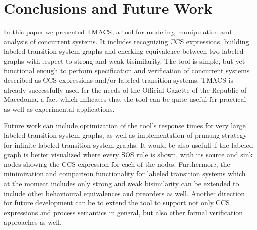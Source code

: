 \section{Conclusions and Future Work}
\label{sec:conclusion}

In this paper we presented TMACS, a tool for modeling, manipulation and analysis of concurrent systems. It includes recognizing CCS expressions, building labeled transition system graphs and checking equivalence between two labeled graphs with respect to strong and weak bisimilarity. The tool is simple, but yet functional enough to perform specification and verification of concurrent systems described as CCS expressions and/or labeled transition systems. TMACS is already successfully used for the needs of the Official Gazette of the Republic of Macedonia, a fact which indicates that the tool can be quite useful for practical as well as experimental applications.

Future work can include optimization of the tool's response times for very large labeled transition system graphs, as well as implementation of prunung strategy for infinite labeled transition system graphs. It would be also usefull if the labeled graph is better visualized where every SOS rule is shown, with its source and sink nodes showing the CCS expression for each of the nodes. 
Furthermore, the minimization and comparison functionality for labeled transition systems which at the moment includes only strong and weak bisimilarity can be extended to include other behavioural equivalences and preorders as well.
Another direction for future development can be to extend the tool to support not only CCS expressions and process semantics in general, but also other formal verification approaches as well. 
